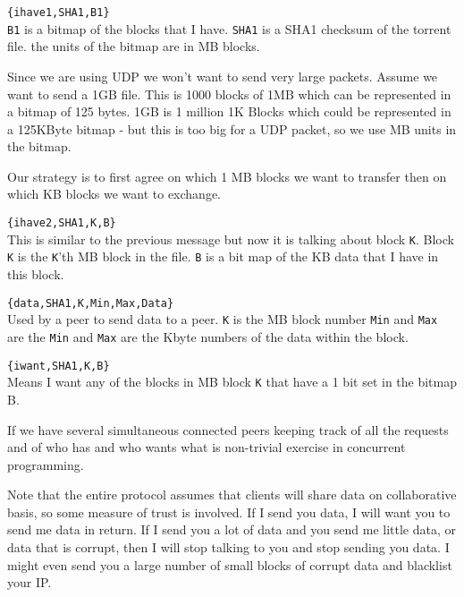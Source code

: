 \documentclass[10pt]{article}
\begin{document}
\begin{description}
\item \verb+{ihave1,SHA1,B1}+\\
\verb+B1+ is a bitmap of the blocks that I have.
\verb+SHA1+ is a SHA1 checksum of the torrent file.
the units of the bitmap are in MB blocks.

Since we are using UDP we won't want to send very large packets.
Assume we want to send a 1GB file. This is 1000 blocks of 1MB
which can be represented in a bitmap of 125 bytes. 
1GB is 1 million 1K Blocks which could be represented in a
125KByte bitmap - but this is too big for a UDP packet, so we use MB units
in the bitmap.

Our strategy is to first agree on which 1 MB blocks we want to
transfer then on which KB blocks we want to exchange.

\item \verb+{ihave2,SHA1,K,B}+\\
This is similar to the previous message but now it is talking about
block \verb+K+. Block \verb+K+ is the \verb+K+'th MB block in the file.
\verb+B+ is a bit map of the KB data that I have in this block.

\item \verb+{data,SHA1,K,Min,Max,Data}+\\
Used by a peer to send data to a peer.  
\verb+K+ is the MB block number
\verb+Min+ and \verb+Max+ are the \verb+Min+ and \verb+Max+ 
are the Kbyte numbers of the data within the block.

\item \verb+{iwant,SHA1,K,B}+\\
  Means I want any of the blocks in MB block \verb+K+ that have a
  1 bit set in the bitmap B.

\end{description}

If we have several simultaneous connected peers keeping track of all the
requests and of who has and who wants what is non-trivial exercise
in concurrent programming.

Note that the entire protocol assumes that clients will share data on
collaborative basis, so some measure of trust is involved. If I send
you data, I will want you to send me data in return. If I send you a
lot of data and you send me little data, or data that is corrupt, then
I will stop talking to you and stop sending you data. I might even
send you a large number of small blocks of corrupt data and
blacklist your IP.
\end{document}

